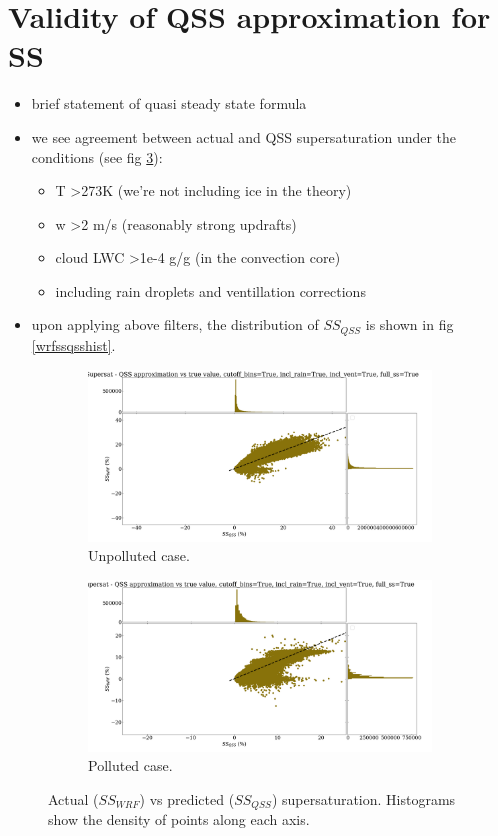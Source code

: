 \documentclass{article}
\begin{document}
\section{Validity of QSS approximation for SS}
\begin{itemize}
	\item brief statement of quasi steady state formula 
	\item we see agreement between actual and QSS supersaturation under the conditions (see fig \ref{wrfvsqss}):
	\begin{itemize}
		\item T \textgreater  273K (we're not including ice in the theory)
		\item w \textgreater  2 m/s (reasonably strong updrafts)
		\item cloud LWC \textgreater  1e-4 g/g (in the convection core)
		\item including rain droplets and ventillation corrections
	\end{itemize}
	\item upon applying above filters, the distribution of $SS_{QSS}$ is shown in fig \ref{wrfssqsshist}.
\end{itemize}
\begin{figure}[ht]
	\centering
	\begin{subfigure}{0.7\textwidth}
		\includegraphics[width=\textwidth]{revmywrf/v12_fancy_ss_qss_vs_ss_wrf_Unpolluted_figure.png}
		\caption{Unpolluted case.}
		\label{wrfvsqssunpoll}
	\end{subfigure}
	\begin{subfigure}{0.7\textwidth}
		\includegraphics[width=\textwidth]{revmywrf/v12_fancy_ss_qss_vs_ss_wrf_Polluted_figure.png}
		\caption{Polluted case.}
		\label{wrfvsqsspoll}
	\end{subfigure}
	\caption{Actual ($SS_{WRF}$) vs predicted ($SS_{QSS}$) supersaturation. Histograms show the density of points along each axis.}
	\label{wrfvsqss}
\end{figure}
\end{document}
